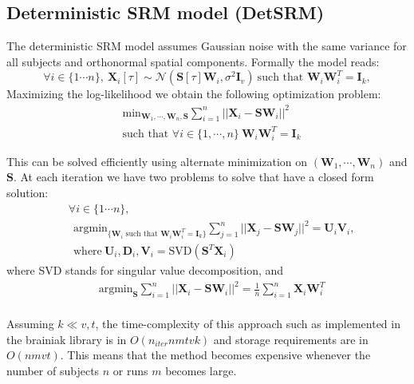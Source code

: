 \documentclass{report}
\begin{document}
\subsection{Deterministic SRM model (DetSRM)}
The deterministic SRM model assumes Gaussian noise with the same variance for all subjects and orthonormal spatial components.
%
Formally the model reads:
\[
	\forall i \in \{1 \cdots n\}, \ \mathbf{X}_{i}[\tau] \sim \mathcal{N}(\mathbf{S}[\tau] \mathbf{W}_i, \sigma^2 \mathbf{I}_v) \   \text{such that }  \mathbf{W}_i \mathbf{W}_i^T = \mathbf{I}_k,
\]
%
Maximizing the log-likelihood we obtain the following optimization problem:
\begin{align*}
&\text{min}_{\mathbf{W}_1, \cdots, \mathbf{W}_n, \mathbf{S}} \sum_{i=1}^n ||\mathbf{X}_{i} - \mathbf{S}\mathbf{W}_i||^2 \\
&\text{such that } \forall i \in \{1,\cdots, n\} \  \mathbf{W}_i \mathbf{W}_i^T = \mathbf{I}_k
\end{align*}

This can be solved efficiently using alternate minimization on 
$(\mathbf{W}_1, \cdots , \mathbf{W}_n )$ and $\mathbf{S}$. At each iteration we have two problems to solve that have a closed form solution:
\begin{align*}
	&\forall i \in \{1 \cdots n\}, \\
	& \ \ \text{argmin}_{\{\mathbf{W}_i \text{ such that } \mathbf{W}_i\mathbf{W}_i^T = \mathbf{I}_k\}} \sum_{j=1}^n ||\mathbf{X}_{j} - \mathbf{S}\mathbf{W}_j||^2 = \mathbf{U}_i \mathbf{V}_i,  \\
		   &\ \  \text{where} \ \mathbf{U}_i, \mathbf{D}_i, \mathbf{V}_i = \text{SVD}(\mathbf{S}^T \mathbf{X}_i)
\end{align*}
where SVD stands for singular value decomposition, and
\begin{align*}
&\text{argmin}_{\mathbf{S}} \sum_{i=1}^n ||\mathbf{X}_{i} - \mathbf{S}\mathbf{W}_i||^2 = \frac{1}{n} \sum_{i=1}^n \mathbf{X}_i \mathbf{W}_i^T  \\
\end{align*}

Assuming $k \ll v, t$, the time-complexity of this approach such as implemented in the brainiak library is in $O(n_{iter} nmtvk)$ and storage requirements are in $O(nmvt)$. This means that the method becomes expensive whenever the number of subjects $n$ or runs $m$ becomes large.
\end{document}
